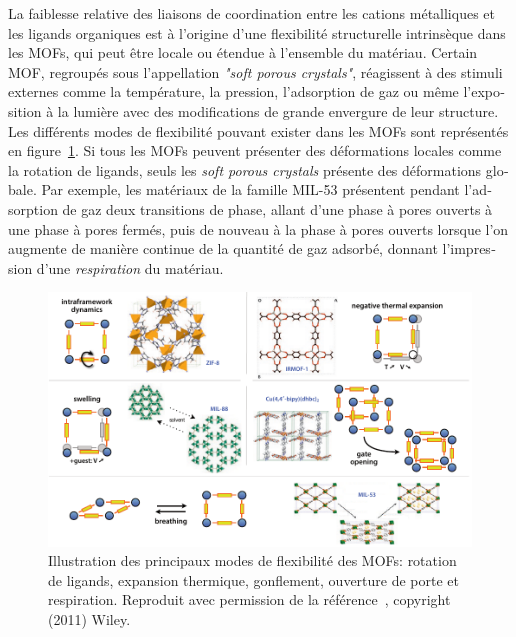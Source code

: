 \documentclass[thesis]{subfiles}
\begin{document}
\begin{otherlanguage}{french}
La faiblesse relative des liaisons de coordination entre les cations métalliques
et les ligands organiques est à l'origine d'une flexibilité structurelle
intrinsèque dans les MOFs, qui peut être locale ou étendue à l'ensemble du
matériau. Certain MOF, regroupés sous l'appellation \emph{"soft porous
crystals"}, réagissent à des stimuli externes comme la température, la pression,
l'adsorption de gaz ou même l'exposition à la lumière avec des modifications de
grande envergure de leur structure. Les différents modes de flexibilité pouvant
exister dans les MOFs sont représentés en figure~\ref{fig:fr:mof-flexibility}.
Si tous les MOFs peuvent présenter des déformations locales comme la rotation de
ligands, seuls les \emph{soft porous crystals} présente des déformations
globale. Par exemple, les matériaux de la famille MIL-53 présentent pendant
l'adsorption de gaz deux transitions de phase, allant d'une phase à pores
ouverts à une phase à pores fermés, puis de nouveau à la phase à pores
ouverts\cite{Serre2002} lorsque l'on augmente de manière continue de la quantité
de gaz adsorbé, donnant l'impression d'une \emph{respiration} du matériau.

\begin{figure}[ht]
    \centering
    \includegraphics[width=\textwidth]{figures/cited/mof-flexibility}
    \caption{Illustration des principaux modes de flexibilité des MOFs: rotation
    de ligands, expansion thermique, gonflement, ouverture de porte et
    respiration. Reproduit avec permission de la référence~\cite{Coudert2011},
    copyright (2011) Wiley.}
    \label{fig:fr:mof-flexibility}
\end{figure}


\end{otherlanguage}
\end{document}
